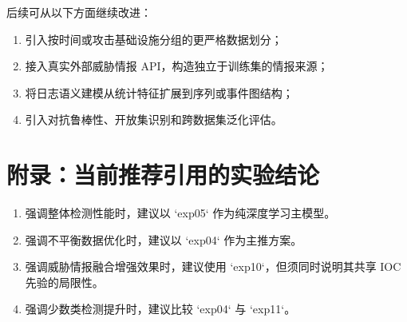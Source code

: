 \documentclass[UTF8,a4paper,12pt]{ctexart}
\begin{document}
后续可从以下方面继续改进：
\begin{enumerate}[leftmargin=2em]
    \item 引入按时间或攻击基础设施分组的更严格数据划分；
    \item 接入真实外部威胁情报 API，构造独立于训练集的情报来源；
    \item 将日志语义建模从统计特征扩展到序列或事件图结构；
    \item 引入对抗鲁棒性、开放集识别和跨数据集泛化评估。
\end{enumerate}

\section*{附录：当前推荐引用的实验结论}
\begin{enumerate}[leftmargin=2em]
    \item 强调整体检测性能时，建议以 `exp05` 作为纯深度学习主模型。
    \item 强调不平衡数据优化时，建议以 `exp04` 作为主推方案。
    \item 强调威胁情报融合增强效果时，建议使用 `exp10`，但须同时说明其共享 IOC 先验的局限性。
    \item 强调少数类检测提升时，建议比较 `exp04` 与 `exp11`。
\end{enumerate}



\end{document}
